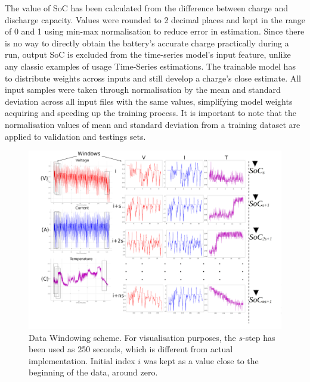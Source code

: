 
%
%
The value of SoC has been calculated from the difference between charge and discharge capacity.
Values were rounded to 2 decimal places and kept in the range of 0 and 1 using min-max normalisation to reduce error in estimation.
Since there is no way to directly obtain the battery's accurate charge practically during a run, output SoC is excluded from the time-series model's input feature, unlike any classic examples of usage Time-Series estimations.
The trainable model has to distribute weights across inputs and still develop a charge's close estimate.
All input samples were taken through normalisation by the mean and standard deviation across all input files with the same values, simplifying model weights acquiring and speeding up the training process.
It is important to note that the normalisation values of mean and standard deviation from a training dataset are applied to validation and testings sets.
\begin{landscape}
    \begin{figure}[ht]
        \centering
        \includegraphics[width=\linewidth]{II_Body/images/windowing3f-A3.jpg}
        \caption{Data Windowing scheme. For visualisation purposes, the $s$-step has been used as 250 seconds, which is different from actual implementation. Initial index $i$ was kept as a value close to the beginning of the data, around zero.}
        \label{fig:Windowing3f}
    \end{figure}
\end{landscape}